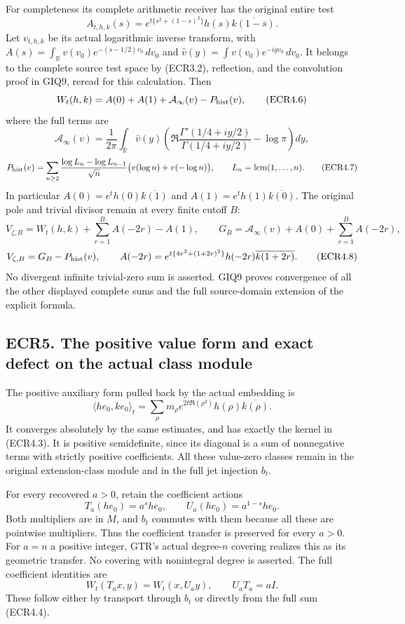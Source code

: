 For completeness its complete arithmetic receiver has the original
entire test \[
A_{t,h,k}(s)=e^{t\{s^2+(1-s)^2\}}
h(s)\overline{k(1-\overline s)}.
\tag{ECR4.5}
\] Let \(v_{t,h,k}\) be its actual logarithmic inverse transform, with
\(A(s)=\int_{\mathbb R}v(v_0)e^{-(s-1/2)v_0}\,dv_0\) and
\(\widehat v(y)=\int v(v_0)e^{-iyv_0}\,dv_0\). It belongs to the
complete source test space by (ECR3.2), reflection, and the convolution
proof in GIQ9, reread for this calculation. Then \[
W_t(h,k)=A(0)+A(1)+\mathcal A_\infty(v)-P_{\rm hist}(v),
\tag{ECR4.6}
\] where the full terms are \[
\mathcal A_\infty(v)=\frac1{2\pi}\int_{\mathbb R}\widehat v(y)
\left(\Re\frac{\Gamma'(1/4+iy/2)}{\Gamma(1/4+iy/2)}-\log\pi\right)dy,
\] \[
P_{\rm hist}(v)=\sum_{n\ge2}\frac{\log L_n-\log L_{n-1}}{\sqrt n}
\bigl(v(\log n)+v(-\log n)\bigr),\qquad
L_n=\operatorname{lcm}(1,\ldots,n).
\tag{ECR4.7}
\] In particular \(A(0)=e^t h(0)\overline{k(1)}\) and
\(A(1)=e^t h(1)\overline{k(0)}\). The original pole and trivial divisor
remain at every finite cutoff \(B\): \[
V_{\zeta,B}=W_t(h,k)+\sum_{r=1}^B A(-2r)-A(1),
\qquad
G_B=\mathcal A_\infty(v)+A(0)+\sum_{r=1}^B A(-2r),
\] \[
V_{\zeta,B}=G_B-P_{\rm hist}(v),\qquad
A(-2r)=e^{t\{4r^2+(1+2r)^2\}}h(-2r)\overline{k(1+2r)}.
\tag{ECR4.8}
\] No divergent infinite trivial-zero sum is asserted. GIQ9 proves
convergence of all the other displayed complete sums and the full
source-domain extension of the explicit formula.

\subsection{ECR5. The positive value form and exact defect on the actual
class
module}\label{ecr5.-the-positive-value-form-and-exact-defect-on-the-actual-class-module}

The positive auxiliary form pulled back by the actual embedding is \[
\langle h e_0,k e_0\rangle_t
=\sum_\rho m_\rho e^{2t\Re(\rho^2)}
h(\rho)\overline{k(\rho)}.
\tag{ECR5.1}
\] It converges absolutely by the same estimates, and has exactly the
kernel in (ECR4.3). It is positive semidefinite, since its diagonal is a
sum of nonnegative terms with strictly positive coefficients. All these
value-zero classes remain in the original extension-class module and in
the full jet injection \(b_t\).

For every recovered \(a>0\), retain the coefficient actions \[
T_a(h e_0)=a^s h e_0,\qquad U_a(h e_0)=a^{1-s}h e_0.
\tag{ECR5.2}
\] Both multipliers are in \(M\), and \(b_t\) commutes with them because
all these are pointwise multipliers. Thus the coefficient transfer is
preserved for every \(a>0\). For \(a=n\) a positive integer, GTR's
actual degree-\(n\) covering realizes this as its geometric transfer. No
covering with nonintegral degree is asserted. The full coefficient
identities are \[
W_t(T_a x,y)=W_t(x,U_a y),\qquad U_aT_a=aI.
\tag{ECR5.3}
\] These follow either by transport through \(b_t\) or directly from the
full sum (ECR4.4).

